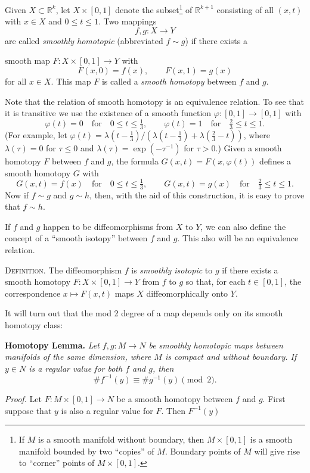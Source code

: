 Given $X \subset \mathbb{R}^k$, let $X \times [0, 1]$ denote the subset\footnote{If $M$ is a smooth manifold without boundary, then $M \times [0, 1]$ is a smooth manifold bounded by two ``copies'' of $M$. Boundary points of $M$ will give rise to ``corner'' points of $M \times [0, 1]$.} of $\mathbb{R}^{k+1}$ consisting of all $(x, t)$ with $x \in X$ and $0 \leq t \leq 1$. Two mappings
\[
f, g: X \to Y
\]
are called \emph{smoothly homotopic} (abbreviated $f \sim g$) if there exists a



smooth map $F : X \times [0, 1] \to Y$ with
\[
F(x, 0) = f(x), \qquad F(x, 1) = g(x)
\]
for all $x \in X$. This map $F$ is called a \emph{smooth homotopy} between $f$ and $g$.

Note that the relation of smooth homotopy is an equivalence relation. To see that it is transitive we use the existence of a smooth function $\varphi : [0, 1] \to [0, 1]$ with
\[
\varphi(t) = 0 \quad \text{for} \quad 0 \leq t \leq \tfrac{1}{3}, \qquad
\varphi(t) = 1 \quad \text{for} \quad \tfrac{2}{3} \leq t \leq 1.
\]
(For example, let $\varphi(t) = \lambda(t - \tfrac{1}{3}) / (\lambda(t - \tfrac{1}{3}) + \lambda(\tfrac{2}{3} - t))$, where $\lambda(\tau) = 0$ for $\tau \leq 0$ and $\lambda(\tau) = \exp(-\tau^{-1})$ for $\tau > 0$.) Given a smooth homotopy $F$ between $f$ and $g$, the formula $G(x, t) = F(x, \varphi(t))$ defines a smooth homotopy $G$ with
\[
G(x, t) = f(x) \quad \text{for} \quad 0 \leq t \leq \tfrac{1}{3}, \qquad
G(x, t) = g(x) \quad \text{for} \quad \tfrac{2}{3} \leq t \leq 1.
\]
Now if $f \sim g$ and $g \sim h$, then, with the aid of this construction, it is easy to prove that $f \sim h$.

If $f$ and $g$ happen to be diffeomorphisms from $X$ to $Y$, we can also define the concept of a ``smooth isotopy'' between $f$ and $g$. This also will be an equivalence relation.

\textsc{Definition.} The diffeomorphism $f$ is \emph{smoothly isotopic} to $g$ if there exists a smooth homotopy $F : X \times [0, 1] \to Y$ from $f$ to $g$ so that, for each $t \in [0, 1]$, the correspondence $x \mapsto F(x, t)$ maps $X$ diffeomorphically onto $Y$.

It will turn out that the mod 2 degree of a map depends only on its smooth homotopy class:

\noindent\textbf{Homotopy Lemma.} \textit{Let $f, g : M \to N$ be smoothly homotopic maps between manifolds of the same dimension, where $M$ is compact and without boundary. If $y \in N$ is a regular value for both $f$ and $g$, then}
\[
\#f^{-1}(y) \equiv \#g^{-1}(y) \pmod{2}.
\]

\noindent\textit{Proof.}
Let $F : M \times [0, 1] \to N$ be a smooth homotopy between $f$ and $g$. First suppose that $y$ is also a regular value for $F$. Then $F^{-1}(y)$

